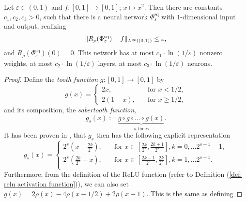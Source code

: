 \begin{proposition} \label{prop: approximation by square}
    Let $\varepsilon \in (0, 1)$ and $f: [0, 1] \to [0, 1]; \,  x \mapsto x^2$. Then
    there are constants $c_1, c_2, c_3 > 0$, such that there is a
    neural network $\Phi^{\text{sq}}_\varepsilon$ with $1$-dimensional
    input and output, realizing
    \begin{equation*}
        \lVert R_\rho(\Phi^{\text{sq}}_\varepsilon) - f \rVert_{L^\infty((0, 1))}\leq \varepsilon,
    \end{equation*}
    and $R_\rho(\Phi^{\text{sq}}_\varepsilon)(0) = 0$. This network has at most 
    $c_1 \cdot \ln(1/\varepsilon)$ nonzero weights, at most
    $c_2 \cdot \ln(1/\varepsilon)$ layers, at most $c_3 \cdot \ln(1/\varepsilon)$ neurons.
\end{proposition}
\begin{proof}
    Define the \emph{tooth function} $g: [0,1] \to [0,1]$ by
    \begin{equation*}
        g(x) = \begin{cases}
            2x, \quad &\text{for } x < 1/2, \\
            2(1-x), \quad &\text{for } x \geq 1/2,
        \end{cases}
    \end{equation*}
    and its composition, the \emph{sabertooth function}, 
    \begin{equation*}
        g_s(x) := \underbrace{g \circ g \circ \dots \circ g(x)}_{s \text{-times}}. 
    \end{equation*}
    It has been proven in \cite{telgarsky2015}, that $g_s$ then has the following
    explicit representation
    \begin{equation*}
        g_s(x) = \begin{cases}
            2^s\left( x - \frac{2k}{2^s} \right), \quad &\text{for } x \in \left[\frac{2k}{2^s}, \frac{2k + 1}{2^s}\right], 
            k = 0, \dots 2^{s-1}-1, \\[0.8em]
            2^s\left(\frac{2k}{2^s} - x \right), \quad &\text{for } x \in \left[\frac{2k - 1}{2^s}, \frac{2k}{2^s}\right], 
            k = 1, \dots 2^{s-1}. \\
        \end{cases}
    \end{equation*}
    Furthermore, from the definition of the ReLU function (refer to Definition (\ref{def: relu activation function})),
    we can also set $g(x) = 2 \rho(x) - 4 \rho(x - 1/2) + 2 \rho(x - 1)$. This is the same as defining

\end{proof}
